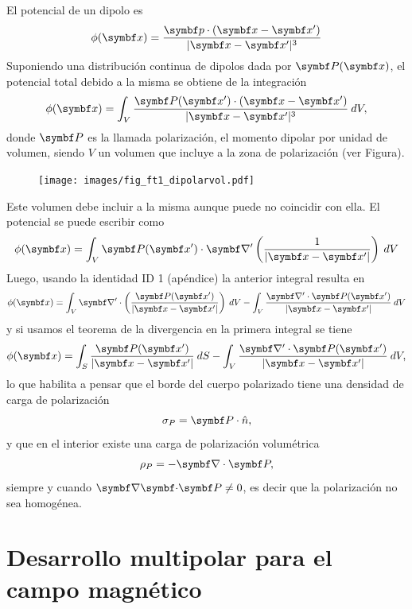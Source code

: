\documentclass[10pt,oneside]{CBFT_book}
\begin{document}
El potencial de un dipolo es
\[
	\phi(\vb{x}) = \frac{ \vb{p}\cdot(\vb{x}-\vb{x}') }{|\vb{x} - \vb{x}'|^3} 
\]
Suponiendo una distribución continua de dipolos dada por $\vb{P}(\vbx)$, el potencial total debido
a la misma se obtiene de la integración
\[
	\phi(\vb{x}) = \int_V \frac{ \vb{P}(\vb{x}')\cdot(\vb{x}-\vb{x}') }{|\vb{x} - \vb{x}'|^3}  \: dV,
\]
donde $\vb{P}$ es la llamada polarización, el momento dipolar por unidad de volumen, siendo $V$ un volumen
que incluye a la zona de polarización (ver Figura).
\begin{figure}[htb]
	\begin{center}
	\texttt{[image: images/fig\_ft1\_dipolarvol.pdf]}	 
	\end{center}
	\caption{}
\end{figure}
Este volumen debe incluir a la misma aunque puede no coincidir con ella.
El potencial se puede escribir como 
\[
	\phi(\vb{x}) = \int_V \vb{P}(\vb{x}')\cdot \Nabla' \left(\frac{1}{|\vb{x} - \vb{x}'|} \right)\: dV
\]
Luego, usando la identidad ID 1 (apéndice) la anterior integral resulta en
\[
	\phi(\vb{x}) = \int_V  \Nabla' \cdot \left( \frac{\vb{P}(\vb{x}')}{|\vb{x} - \vb{x}'|} \right) \: dV
	- \int_V \frac{ \Nabla' \cdot \vb{P}(\vb{x}') }{|\vb{x} - \vb{x}'|} \: dV
\]
y si usamos el teorema de la divergencia en la primera integral se tiene
\[
	\phi(\vb{x}) = \int_S \frac{\vb{P}(\vb{x}')}{ |\vb{x} - \vb{x}'|} \: dS
	- \int_V  \frac{  \Nabla' \cdot \vb{P}(\vb{x}') }{|\vb{x} - \vb{x}'|} \: dV, 
\]
lo que habilita a pensar que el borde del cuerpo polarizado tiene una densidad de carga
de polarización
\[
	\sigma_P = \vb{P}\cdot\hat{n},
\]
y que en el interior existe una carga de polarización volumétrica
\[
	\rho_P = - \Nabla\cdot\vb{P},
\]
siempre y cuando $\divem{P}\neq 0$, es decir que la polarización no sea homogénea.

\section{Desarrollo multipolar para el campo magnético}
\end{document}
